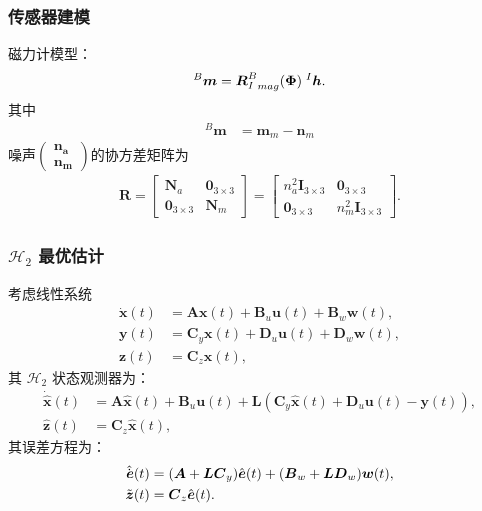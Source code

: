 \documentclass{beamer}
\newcommand{\vo}[1]{\boldsymbol{#1}}
\begin{document}
	\begin{frame}
		\frametitle{传感器建模}
		
		磁力计模型：
		\begin{align}
			{}^B \vo{m} = {\vo{R}^B_I}_{mag} (\vo{\Phi}) \hspace{0.1cm} {}^I \vo{h} \label{mag_model}.
		\end{align}
	其中
	\begin{align}
		^B{\vo{m}} &= \vo{m}_m - \vo{n}_m  \label{phi_dot} \nonumber
	\end{align}
	噪声$\begin{pmatrix}\vo{n_a}\\\vo{n_m}\end{pmatrix}$的协方差矩阵为
	\begin{gather}
		\vo{R} =
		\begin{bmatrix}
			\vo{N}_a & \vo{0}_{3\times3}\\
			\vo{0}_{3\times3} & \vo{N}_m
		\end{bmatrix}
		=
		\begin{bmatrix}
			n^2_a \vo{I}_{3\times3} & \vo{0}_{3\times3}\\
			\vo{0}_{3\times3} & n^2_m \vo{I}_{3\times3}
		\end{bmatrix}. \nonumber
	\end{gather}
	\end{frame}

	\begin{frame}
		\frametitle{$\mathcal{H}_2$ 最优估计}
		
		考虑线性系统
	\begin{subequations}\label{system_CT}
		\begin{align}
			\Dot{\vo{x}}(t) &=  \vo{A} \vo{x}(t) + \vo{B}_u \vo{u}(t) + \vo{B}_w \vo{w}(t),\\
			\vo{y}(t) &= \vo{C}_y \vo{x}(t) + \vo{D}_u \vo{u}(t)+ \vo{D}_w \vo{w}(t),\\
			\vo{z}(t) &= \vo{C}_z \vo{x}(t),
		\end{align}
	\end{subequations}
 其 $\mathcal{H}_2$ 状态观测器为：
		\begin{subequations} \label{estimation_CT}
			\begin{align}
				\Dot{\hat{\vo{x}}}(t) &= \vo{A} \hat{\vo{x}}(t) + \vo{B}_u \vo{u}(t) + \vo{L} (\vo{C}_y \hat{\vo{x}}(t) + \vo{D}_u \vo{u}(t) - \vo{y}(t)),\\
				\hat{\vo{z}}(t) &= \vo{C}_z \hat{\vo{x}}(t),
			\end{align}
		\end{subequations}
	其误差方程为：
	\begin{subequations} \label{estimator_Linear}
		\begin{align}
			\hat{\Dot{\vo{e}}}(t) &= (\vo{A}+\vo{L} \vo{C}_y) \hat{\vo{e}}(t) + (\vo{B}_w+\vo{L} \vo{D}_w)\vo{w}(t), \\
			\Tilde{\vo{z}}(t) &= \vo{C}_z \hat{\vo{e}}(t).
		\end{align}
	\end{subequations}
	\end{frame}
\end{document}
